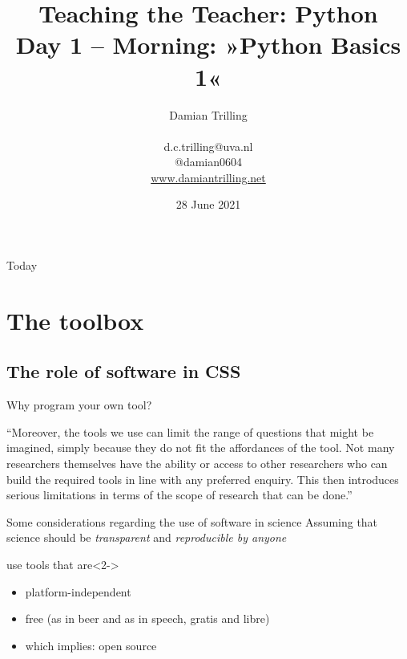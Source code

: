 \documentclass{beamer}
\title[Big Data and Automated Content Analysis]{\textbf{Teaching the Teacher: Python} \\ Day 1 -- Morning: »Python Basics 1«}
\author[Damian Trilling]{Damian Trilling \\ ~ \\ \footnotesize{d.c.trilling@uva.nl \\@damian0604} \\ \url{www.damiantrilling.net}}
\date{28 June 2021}
\institute[UvA]{Afdeling Communicatiewetenschap \\Universiteit van Amsterdam}
\begin{document}
	
	\begin{frame}{}
		\titlepage
	\end{frame}
	
	\begin{frame}{Today}
		\tableofcontents
	\end{frame}

	
	\section{The toolbox}
	\subsection{The role of software in CSS}
	
	
	
	\begin{frame}{Why program your own tool?}
		\begin{block}{\textcite{Vis2013}}
			``Moreover, the tools we use can limit the range of questions that might be imagined, simply because they do not fit the affordances of the tool. Not many researchers themselves have the ability or access to other researchers who can build the required tools in line with any preferred enquiry. This then introduces serious limitations in terms of the scope of research that can be done.''	
		\end{block}
		
	\end{frame}
	
	
	\begin{frame}{Some considerations regarding the use of software in science}
		Assuming that science should be \emph{transparent} and \emph{reproducible by anyone}\onslide<2->{, we should}
		\begin{block}{use tools that are}<2->
			\begin{itemize}
				\item platform-independent 
				\item free (as in beer and as in speech, gratis and libre)
				\item which implies: open source
			\end{itemize}
		\end{block}
	\end{frame}
	
\end{document}
